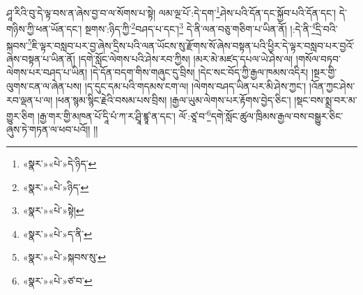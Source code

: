 ཤཱ་རིའི་བུ་དེ་ལྟ་བས་ན་ཞེས་བྱ་བ་ལ་སོགས་པ་སྟེ། ལམ་ལྔ་པོ་:དེ་དག་\footnote{«སྣར་»«པེ་»དེ་ཉིད་}ཤེས་པའི་དོན་དང་སྐྱོབ་པའི་དོན་དང་། དེ་གཉིས་ཀྱི་ཕན་ཡོན་དང་། སྔགས་:ཉིད་ཀྱི་\footnote{«སྣར་»«པེ་»ཉིད་}བཤད་པ་དང་།\footnote{«སྣར་»«པེ་»སྟེ།} དེ་ནི་ལན་བཅུ་གཅིག་པ་ཡིན་ནོ། །:དེ་ནི་\footnote{«སྣར་»«པེ་»ད་ནི་}དྲི་བའི་སྐབས་\footnote{«སྣར་»«པེ་»སྐབས་སུ་}ཇི་ལྟར་བསླབ་པར་བྱ་ཞེས་དྲིས་པའི་ལན་ཡོངས་སུ་རྫོགས་སོ་ཞེས་བསྟན་པའི་ཕྱིར་དེ་ལྟར་བསླབ་པར་བྱའོ་ཞེས་བསྟན་པ་ཡིན་ནོ། །དགེ་སློང་ལེགས་པའི་ཤེས་རབ་ཀྱིས། །མར་མེ་མཛད་དཔལ་ཡེ་ཤེས་ལ། །གསོལ་བཏབ་ལེགས་པར་བཤད་པ་ཡིན། །དེ་དོན་བདག་གིས་གཞུང་དུ་བྲིས། །དེང་སང་བོད་ཀྱི་རྒྱལ་ཁམས་འདིར། །སྔར་གྱི་ལུགས་ངན་ལ་ཞེན་པས། །ད་དུང་དམ་པའི་གདམས་ངག་ལ། །ལེགས་བཤད་ཡིན་པར་མི་ཤེས་ཀྱང་། །འོན་ཀྱང་ཤེས་རབ་ལྡན་པ་ལ། །ཕན་སྙམ་སྙིང་རྗེའི་བསམ་པས་བྲིས། །རྒྱལ་ཡུམ་ལེགས་པར་རྟོགས་བྱེད་ཅིང་། །སྡང་བས་སྨྲ་བར་མ་གྱུར་ཅིག །རྒྱ་གར་གྱི་མཁན་པོ་དཱི་པཾ་ཀ་ར་ཤྲཱི་ཛྙཱ་ན་དང་། ལོ་:ཙཱ་བ་\footnote{«སྣར་»«པེ་»ཙ་བ་}དགེ་སློང་ཚུལ་ཁྲིམས་རྒྱལ་བས་བསྒྱུར་ཅིང་ཞུས་ཏེ་གཏན་ལ་ཕབ་པའོ།། །།